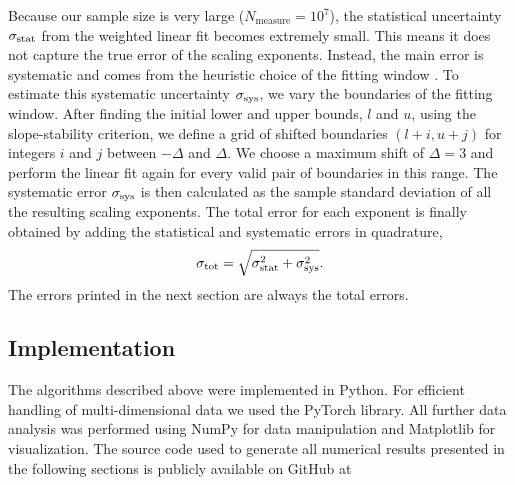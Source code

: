 Because our sample size is very large ($N_\mathrm{measure}=10^{7}$), the statistical uncertainty $\sigma_{\mathrm{stat}}$ from the weighted linear fit becomes extremely small. This means it does not capture the true error of the scaling exponents. Instead, the main error is systematic and comes from the heuristic choice of the fitting window \cite{pruessner2012numerical}. To estimate this systematic uncertainty $\sigma_{\mathrm{sys}}$, we vary the boundaries of the fitting window. After finding the initial lower and upper bounds, $l$ and $u$, using the slope-stability criterion, we define a grid of shifted boundaries $(l+i, u+j)$ for integers $i$ and $j$ between $-\Delta$ and $\Delta$. We choose a maximum shift of $\Delta=3$ and perform the linear fit again for every valid pair of boundaries in this range. The systematic error $\sigma_{\mathrm{sys}}$ is then calculated as the sample standard deviation of all the resulting scaling exponents. The total error for each exponent is finally obtained by adding the statistical and systematic errors in quadrature,
\begin{equation}
    \sigma_{\mathrm{tot}}=\sqrt{\sigma_{\mathrm{stat}}^{2}+\sigma_{\mathrm{sys}}^{2}}.
\end{equation}
The errors printed in the next section are always the total errors.

\subsection*{Implementation}
The algorithms described above were implemented in Python. For efficient handling of multi-dimensional data we used the PyTorch \cite{paszke2019pytorch} library. All further data analysis was performed using NumPy \cite{harris2020array} for data manipulation and Matplotlib \cite{hunter2007matplotlib} for visualization. The source code used to generate all numerical results presented in the following sections is publicly available on GitHub at
